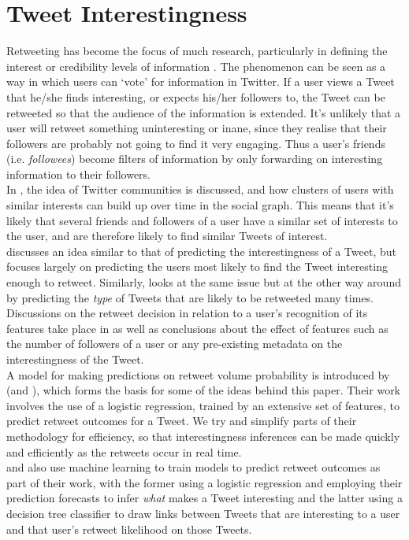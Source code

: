 \section{Tweet Interestingness}
Retweeting has become the focus of much research, particularly in defining the interest or credibility levels of information \cite{castillo11}. The phenomenon can be seen as a way in which users can `vote' for information in Twitter. If a user views a Tweet that he/she finds interesting, or expects his/her followers to, the Tweet can be retweeted so that the audience of the information is extended. It's unlikely that a user will retweet something uninteresting or inane, since they realise that their followers are probably not going to find it very engaging. Thus a user's friends (i.e. \emph{followees}) become filters of information by only forwarding on interesting information to their followers.\\
In \cite{java07}, the idea of Twitter communities is discussed, and how clusters of users with similar interests can build up over time in the social graph. This means that it's likely that several friends and followers of a user have a similar set of interests to the user, and are therefore likely to find similar Tweets of interest.\\
\cite{uysal11} discusses an idea similar to that of predicting the interestingness of a Tweet, but focuses largely on predicting the users most likely to find the Tweet interesting enough to retweet. Similarly, \cite{hong11} looks at the same issue but at the other way around by predicting the \textit{type} of Tweets that are likely to be retweeted many times. Discussions on the retweet decision in relation to a user's recognition of its features take place in \cite{chorley12} as well as conclusions about the effect of features such as the number of followers of a user or any pre-existing metadata on the interestingness of the Tweet.\\
A model for making predictions on retweet volume probability is introduced by \cite{zhu11} (and \cite{peng11}), which forms the basis for some of the ideas behind this paper. Their work involves the use of a logistic regression, trained by an extensive set of features, to predict retweet outcomes for a Tweet. We try and simplify parts of their methodology for efficiency, so that interestingness inferences can be made quickly and efficiently as the retweets occur in real time.\\
\cite{naveed11} and \cite{uysal11} also use machine learning to train models to predict retweet outcomes as part of their work, with the former using a logistic regression and employing their prediction forecasts to infer \textit{what} makes a Tweet interesting and the latter using a decision tree classifier to draw links between Tweets that are interesting to a user and that user's retweet likelihood on those Tweets.

